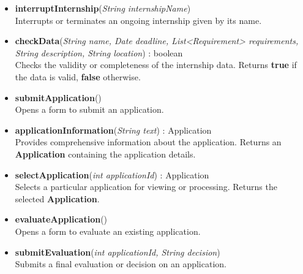 \begin{itemize}
    \item \textbf{interruptInternship}(\textit{String internshipName}) \\
    Interrupts or terminates an ongoing internship given by its name.

    \item \textbf{checkData}(\textit{String name, Date deadline, List<Requirement> requirements, String description, String location}) : boolean \\
    Checks the validity or completeness of the internship data.  
    Returns \textbf{true} if the data is valid, \textbf{false} otherwise.

    \item \textbf{submitApplication}() \\
    Opens a form to submit an application.

    \item \textbf{applicationInformation}(\textit{String text}) : Application \\
    Provides comprehensive information about the application.  
    Returns an \textbf{Application} containing the application details.

    \item \textbf{selectApplication}(\textit{int applicationId}) : Application \\
    Selects a particular application for viewing or processing.  
    Returns the selected \textbf{Application}.

    \item \textbf{evaluateApplication}() \\
    Opens a form to evaluate an existing application.

    \item \textbf{submitEvaluation}(\textit{int applicationId, String decision}) \\
    Submits a final evaluation or decision on an application.

\end{itemize}

